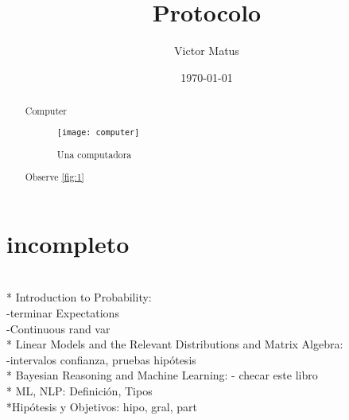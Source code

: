 \documentclass[letterpaper]{article}
\author{Victor Matus}
\title{Protocolo}
\date{\today}
\begin{document}
\maketitle
\begin{abstract}
    Computer
    \begin{figure}[h]
        \centering\texttt{[image: computer]}
        \caption{Una computadora}
        \label{fig:1}
    \end{figure}

Observe \ref{fig:1}
\end{abstract}
\pagebreak
\tableofcontents
\section {incompleto}\ \\
* Introduction to Probability:\\
-terminar Expectations\\
-Continuous rand var\\
* Linear Models and the Relevant Distributions and Matrix Algebra:\\
-intervalos confianza, pruebas hipótesis\\
* Bayesian Reasoning and Machine Learning: - checar este libro\\
* ML, NLP: Definición, Tipos\\
*Hipótesis y Objetivos: hipo, gral, part
\pagebreak
\end{document}
